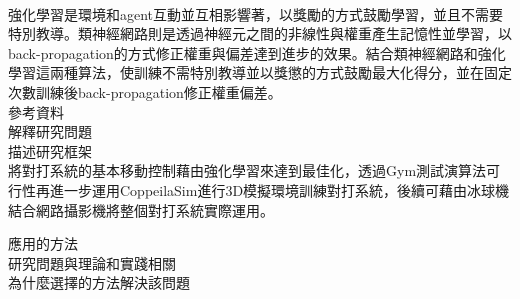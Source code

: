 \begin{flushleft}
{\large {}}\\
\end{flushleft}

強化學習是環境和agent互動並互相影響著，以獎勵的方式鼓勵學習，並且不需要特別教導。類神經網路則是透過神經元之間的非線性與權重產生記憶性並學習，以back-propagation的方式修正權重與偏差達到進步的效果。結合類神經網路和強化學習這兩種算法，使訓練不需特別教導並以獎懲的方式鼓勵最大化得分，並在固定次數訓練後back-propagation修正權重偏差。\\

參考資料\\

解釋研究問題\\

描述研究框架\\
將對打系統的基本移動控制藉由強化學習來達到最佳化，透過Gym測試演算法可行性再進一步運用CoppeilaSim進行3D模擬環境訓練對打系統，後續可藉由冰球機結合網路攝影機將整個對打系統實際運用。

應用的方法\\

研究問題與理論和實踐相關\\

為什麼選擇的方法解決該問題\\

